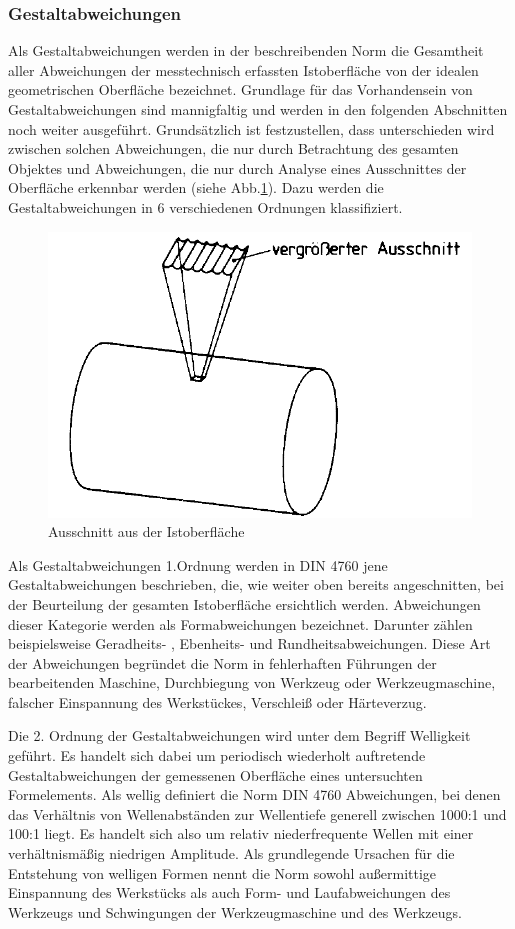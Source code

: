 \subsubsection{Gestaltabweichungen}

Als Gestaltabweichungen werden in der beschreibenden Norm die Gesamtheit aller Abweichungen der messtechnisch erfassten Istoberfläche von der idealen geometrischen Oberfläche bezeichnet. Grundlage für das Vorhandensein von Gestaltabweichungen sind mannigfaltig und werden in den folgenden Abschnitten noch weiter ausgeführt. Grundsätzlich ist festzustellen, dass unterschieden wird zwischen solchen Abweichungen, die nur durch Betrachtung des gesamten Objektes und Abweichungen, die nur durch Analyse eines Ausschnittes der Oberfläche erkennbar werden (siehe Abb.\ref{fig:din4760_1}). Dazu werden die Gestaltabweichungen in 6 verschiedenen Ordnungen klassifiziert. 


\begin{figure}[h]
	\centering
	\includegraphics[width=0.5\linewidth]{img/DIN_4760_1}
	\caption[Ausschnitt aus der Istoberfläche für die Beurteilung der Gestaltabweichung]{Ausschnitt aus der Istoberfläche}
	\label{fig:din4760_1}
\end{figure}

Als Gestaltabweichungen 1.Ordnung werden in DIN 4760 jene Gestaltabweichungen beschrieben, die, wie weiter oben bereits angeschnitten, bei der Beurteilung der gesamten Istoberfläche ersichtlich werden. Abweichungen dieser Kategorie werden als Formabweichungen bezeichnet. Darunter zählen beispielsweise Geradheits- , Ebenheits- und Rundheitsabweichungen. Diese Art der Abweichungen begründet die Norm in fehlerhaften Führungen der bearbeitenden Maschine, Durchbiegung von Werkzeug oder Werkzeugmaschine, falscher Einspannung des Werkstückes, Verschleiß oder Härteverzug.

Die 2. Ordnung der Gestaltabweichungen wird unter dem Begriff Welligkeit geführt. Es handelt sich dabei um periodisch wiederholt auftretende Gestaltabweichungen der gemessenen Oberfläche eines untersuchten Formelements. Als wellig definiert die Norm DIN 4760 Abweichungen, bei denen das Verhältnis von Wellenabständen zur Wellentiefe generell zwischen 1000:1 und 100:1 liegt. Es handelt sich also um relativ niederfrequente Wellen mit einer verhältnismäßig niedrigen Amplitude. Als grundlegende Ursachen für die Entstehung von welligen Formen nennt die Norm sowohl außermittige Einspannung des Werkstücks als auch Form- und Laufabweichungen des Werkzeugs und Schwingungen der Werkzeugmaschine und des Werkzeugs.

